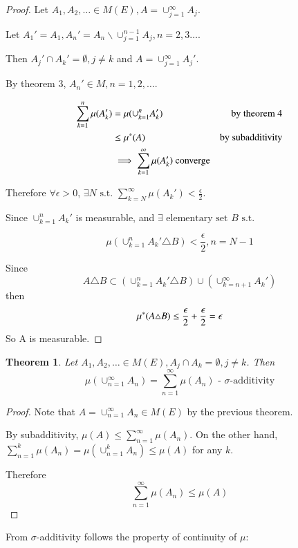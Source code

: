 \documentclass[11pt,a4paper]{report}
\theoremstyle{plain}
\newtheorem{thm}{Theorem}[section]
\theoremstyle{definition}
\theoremstyle{remark}
\newcommand{\union}{\cup}
\newcommand{\intersection}{\cap}
\begin{document}
\begin{proof}
  Let $A_1, A_2, \dots \in M(E), A = \union_{j=1}^\infty A_j$.

  Let $A_1' = A_1, A_n' = A_n \backslash \union_{j=1}^{n-1} A_j, n = 2,3 \dots$.

  Then $A_j' \intersection A_k' = \emptyset, j \neq k$ and $A = \union_{j = 1}^{\infty} A_j'$.

  By theorem 3, $A_n' \in M, n = 1, 2, \dots$.

  \begin{align*} 
    \sum_{k=1}^n \mu(A_k') &= \mu(\union_{k=1}^n A_k') &\text{by theorem 4} \\
      &\leq \mustar(A) & \text{by subadditivity} \\
      & \implies \sum_{k = 1}^{\infty} \mu(A_k') \text{ converge} \\
  \end{align*}

  Therefore $\forall \epsilon > 0$, $\exists N \text{ s.t. } \sum_{k=N}^{\infty} \mu(A_k') < \frac{\epsilon}{2}$.

  Since $\union_{k=1}^{n}A_k'$ is measurable, and $\exists \text{ elementary set } B \text{ s.t. }$

  $$ \mu(\union_{k=1}^nA_k' \triangle B) < \frac{\epsilon}{2}, n = N-1$$

  Since $$ A \triangle B \subset (\union_{k=1}^n A_k' \triangle B) \union (\union_{k=n+1}^\infty A_k') $$
  then $$ \mu^{*} (A \triangle B) \leq \frac{\epsilon}{2} + \frac{\epsilon}{2} = \epsilon $$
  So A is measurable.
\end{proof}

\begin{thm}
  Let $A_1, A_2, \dots \in M(E), A_j \intersection A_k = \emptyset, j \neq k$.
  Then $$ \mu( \union_{n=1}^\infty A_n) = \sum_{n=1}^\infty \mu(A_n) \text{ - $\sigma$-additivity} $$
\end{thm}

\begin{proof}
  Note that $A = \union_{n=1}^\infty A_n \in M(E)$ by the previous theorem.

  By subadditivity, $\mu(A) \leq \sum_{n=1}^\infty \mu(A_n)$.
  On the other hand, $\sum_{n = 1}^k \mu(A_n) = \mu(\union_{n=1}^k A_n) \leq \mu(A)$ for any $k$.

  Therefore $$ \sum_{n=1}^\infty \mu(A_n) \leq \mu(A) $$
\end{proof}

From $\sigma$-additivity follows the property of continuity of $\mu$:
\end{document}
